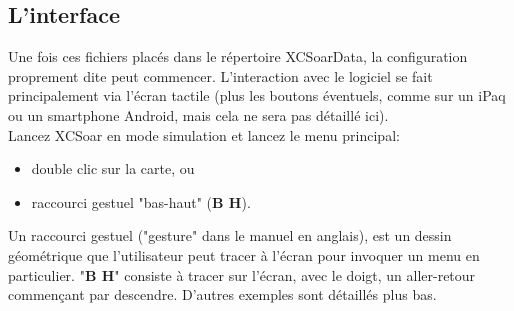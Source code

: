 \documentclass{article}
\begin{document}
\subsection{L'interface}
\noindent
%
Une fois ces fichiers placés dans le répertoire XCSoarData, la configuration proprement dite peut commencer. L'interaction avec le logiciel se fait principalement via l'écran tactile (plus les boutons éventuels, comme sur un iPaq ou un smartphone Android, mais cela ne sera pas détaillé ici).\\
%
\newline
%
Lancez XCSoar en mode simulation et lancez le menu principal:
\begin{itemize}
\item double clic sur la carte,
ou
\item raccourci gestuel "bas-haut" (\textbf{B H}).
\end{itemize}
Un raccourci gestuel ("gesture" dans le manuel en anglais), est un dessin géométrique que l'utilisateur peut tracer à l'écran pour invoquer un menu en particulier. "\textbf{B H}" consiste à tracer sur l'écran, avec le doigt, un aller-retour commençant par descendre. D'autres exemples sont détaillés plus bas.\\
%
\newline
%
\end{document}
